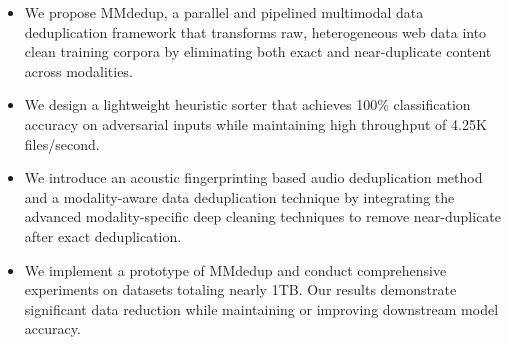 \documentclass[sigconf, nonacm]{acmart}
\begin{document}
\begin{itemize}

    \item We propose MMdedup, a parallel and pipelined multimodal data deduplication framework that transforms raw, heterogeneous web data into clean training corpora by eliminating both exact and near-duplicate content across modalities.
    
    \item We design a lightweight heuristic sorter that achieves 100\% classification accuracy on adversarial inputs while maintaining high throughput of 4.25K files/second.
    \item We introduce an acoustic fingerprinting based audio deduplication method and a modality-aware data deduplication technique by integrating the advanced modality-specific deep cleaning techniques to remove near-duplicate after exact deduplication.
    
    \item We implement a prototype of MMdedup and conduct comprehensive experiments on datasets totaling nearly 1TB. Our results demonstrate significant data reduction while maintaining or improving downstream model accuracy.
\end{itemize}


\end{document}
